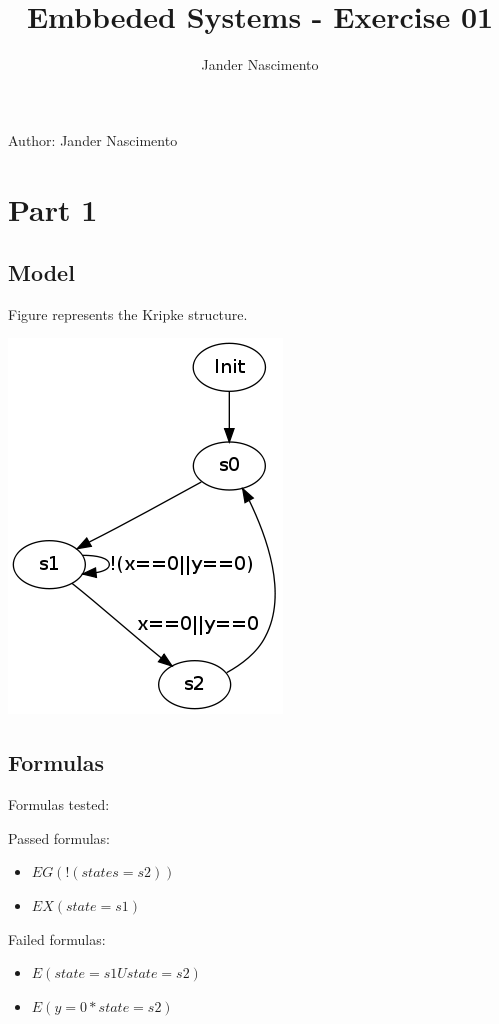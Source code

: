 \documentclass[a4paper]{article}
\begin{document}
\title{Embbeded Systems - Exercise 01}

\author{Jander Nascimento}


Author: Jander Nascimento

\section{Part 1}

\subsection{Model}
     
	Figure represents the Kripke structure.
    
	\includegraphics[scale=0.50]{final}
	
\subsection{Formulas}

Formulas tested:

	Passed formulas:
	
	\begin{itemize}
		\item $EG(!(states=s2))$
		\item $EX(state=s1)$
	\end{itemize}
	
	Failed formulas:
	\begin{itemize}
		\item $E(state=s1 U state=s2)$
		\item $E(y=0 * state=s2)$
	\end{itemize}
	
\end{document}
